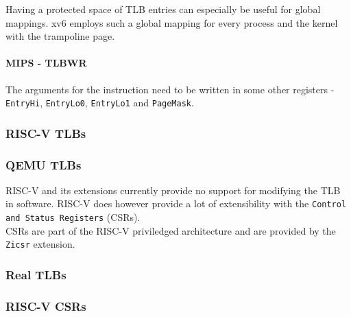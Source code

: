 Having a protected space of TLB entries can especially be useful for global mappings. xv6 employs such a global
mapping for every process and the kernel with the trampoline page.

\paragraph{MIPS - TLBWR} The arguments for the instruction need to be written in some
other registers - \texttt{EntryHi}, \texttt{EntryLo0}, \texttt{EntryLo1} and \texttt{PageMask}.


\subsubsection{RISC-V TLBs}
\subsubsection{QEMU TLBs}
RISC-V and its extensions currently provide no support for modifying the TLB in software.
RISC-V does however provide a lot of extensibility with the \texttt{Control and Status Registers} (CSRs).\\
CSRs are part of the RISC-V priviledged architecture and are provided by the \texttt{Zicsr} extension\cite{RISCVInstructionSet}.\\

\subsubsection{Real TLBs}

\subsubsection{RISC-V CSRs}

